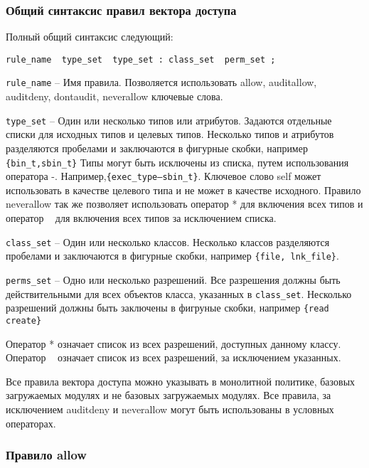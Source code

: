\documentclass{./../class/UIR}
\begin{document}
\subsubsection{Общий синтаксис правил вектора доступа}
    Полный общий синтаксис следующий:
\begin{verbatim}
rule_name  type_set  type_set : class_set  perm_set ;
\end{verbatim}
    \begin{description}
    \item \verb"rule_name" – Имя правила. Позволяется использовать allow,
    auditallow, auditdeny, dontaudit, neverallow ключевые слова.
    \item \verb"type_set" – Один или несколько типов или атрибутов. Задаются
    отдельные списки для исходных типов и целевых типов. Несколько типов и
    атрибутов разделяются пробелами и заключаются в фигурные скобки, например
    \verb"{bin_t,sbin_t}" Типы могут быть исключены из списка, путем
    использования оператора -. Например,\verb"{exec_type–sbin_t}".
    Ключевое слово self может использовать в качестве целевого типа и не может
    в качестве исходного. Правило neverallow так же позволяет использовать
    оператор * для включения всех типов и оператор ~ для включения всех типов
    за исключением списка.
    \item \verb"class_set" – Один или несколько классов. Несколько классов
    разделяются пробелами и заключаются в фигурные скобки, например
    \verb"{file, lnk_file}".
    \item \verb"perms_set" – Одно или несколько разрешений. Все разрешения
    должны быть действительными для всех объектов класса, указанных в
    \verb"class_set". Несколько разрешений должны быть заключены в фигруные
    скобки, например \verb"{read create}"
    \end{description}
    Оператор * означает список из всех разрешений, доступных данному классу.
    Оператор ~ означает список из всех разрешений, за исключением указанных.

    Все правила вектора доступа можно указывать в монолитной политике, базовых
    загружаемых модулях и не базовых загружаемых модулях. Все правила, за
    исключением auditdeny и neverallow могут быть использованы в условных
    операторах.

\subsubsection{Правило allow}
\end{document}
